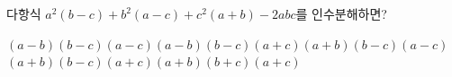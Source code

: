 다항식 $a^2(b-c)+b^2(a-c)+c^2(a+b)-2abc$를 인수분해하면?
\begin{choicesv}{$(a-b)(b-c)(a-c)$}{$(a-b)(b-c)(a+c)$}{$(a+b)(b-c)(a-c)$}{$(a+b)(b-c)(a+c)$}{$(a+b)(b+c)(a+c)$}\end{choicesv}
